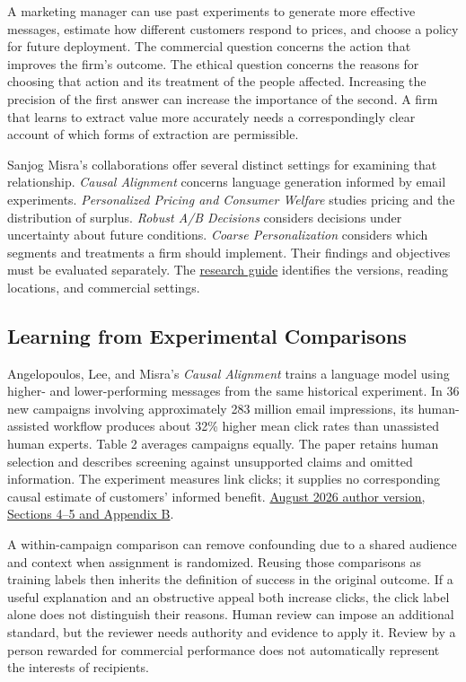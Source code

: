 \noindent A marketing manager can use past experiments to generate more effective
messages, estimate how different customers respond to prices, and choose
a policy for future deployment. The commercial question concerns the
action that improves the firm's outcome. The ethical question concerns
the reasons for choosing that action and its treatment of the people
affected. Increasing the precision of the first answer can increase the
importance of the second. A firm that learns to extract value more
accurately needs a correspondingly clear account of which forms of
extraction are permissible.

Sanjog Misra's collaborations offer several distinct settings for
examining that relationship. \emph{Causal Alignment} concerns language
generation informed by email experiments. \emph{Personalized Pricing and
Consumer Welfare} studies pricing and the distribution of surplus.
\emph{Robust A/B Decisions} considers decisions under uncertainty about
future conditions. \emph{Coarse Personalization} considers which
segments and treatments a firm should implement. Their findings and
objectives must be evaluated separately. The
\href{../01_Resources/16_AI_Experimentation_and_Pricing/01_Research/README.md}{research
guide} identifies the versions, reading locations, and commercial
settings.

\hypertarget{M09-learning-from-experimental-comparisons}{%
\subsection{Learning from Experimental
Comparisons}\label{M09-learning-from-experimental-comparisons}}

\noindent Angelopoulos, Lee, and Misra's \emph{Causal Alignment} trains a language
model using higher- and lower-performing messages from the same
historical experiment. In 36 new campaigns involving approximately 283
million email impressions, its human-assisted workflow produces about
32\% higher mean click rates than unassisted human experts. Table 2
averages campaigns equally. The paper retains human selection and
describes screening against unsupported claims and omitted information.
The experiment measures link clicks; it supplies no corresponding causal
estimate of customers' informed benefit.
\href{https://leekevin.io/caLM.pdf}{August 2026 author version, Sections
4--5 and Appendix B}.

A within-campaign comparison can remove confounding due to a shared
audience and context when assignment is randomized. Reusing those
comparisons as training labels then inherits the definition of success
in the original outcome. If a useful explanation and an obstructive
appeal both increase clicks, the click label alone does not distinguish
their reasons. Human review can impose an additional standard, but the
reviewer needs authority and evidence to apply it. Review by a person
rewarded for commercial performance does not automatically represent the
interests of recipients.

